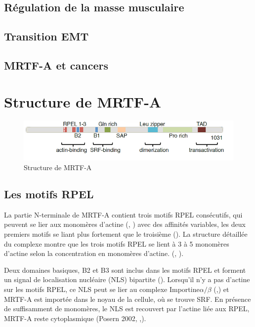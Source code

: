 \documentclass{article}
\begin{document}
\subsection{Régulation de la masse musculaire}
\subsection{Transition EMT}
\subsection{MRTF-A et cancers}

\newpage
\section*{Structure de MRTF-A}

\begin{figure}
\center
\includegraphics[scale=0.5]{MRTFA_structure.png}
\caption{Structure de MRTF-A \parencite{scharenberg_tgf-_2014}}
\end{figure}
 \subsection{Les motifs RPEL}
 
 La partie N-terminale de MRTF-A contient trois motifs RPEL consécutifs, qui peuvent se lier aux monomères d'actine (\cite{posern_mutant_2004}, \cite{mouilleron_molecular_2008}) avec des affinités variables, les deux premiers motifs se liant plus fortement que le troisième (\cite{guettler_rpel_2008}). La structure détaillée du complexe montre que les trois motifs RPEL se lient à 3 à 5 monomères d'actine selon la concentration en monomères d'actine. (\cite{hirano_sensing_2011}, \cite{treisman_structure_2011}). 
 
 Deux domaines basiques, B2 et B3 sont inclus dans les motifs RPEL et forment un signal de localisation nucléaire (NLS) bipartite (\cite{rajakyla_actin-regulated_2010}). Lorsqu'il n'y a pas d'actine sur les motifs RPEL, ce NLS peut se lier au complexe Importine$\alpha / \beta$ (\cite{hirano_sensing_2011},\cite{rajakyla_actin-regulated_2010}) et MRTF-A est importée dans le noyau de la cellule, où se trouve SRF. En présence de suffisamment de monomères, le NLS est recouvert par l'actine liée aux RPEL, MRTF-A reste cytoplasmique (Posern 2002, \cite{miralles_actin_2003},\cite{posern_mutant_2004}). 
 
\end{document}
